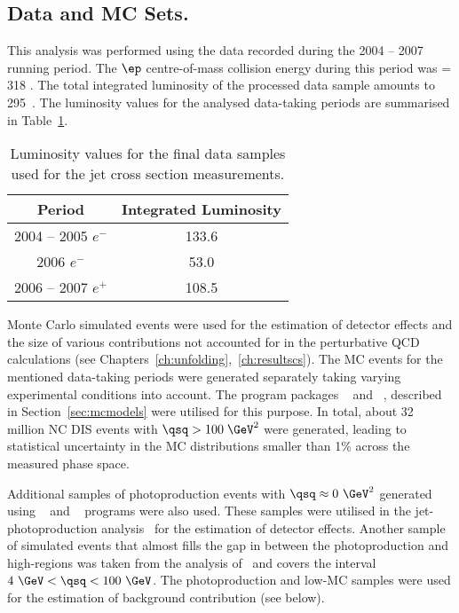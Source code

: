 \subsection{Data and MC Sets.}
This analysis was performed using the data recorded during the 2004 -- 2007 \hera running period. The $\ep$ centre-of-mass collision energy during this period was \sqs = 318 \GeV. The total integrated luminosity of the processed data sample amounts to 295~\invpb. The luminosity values for the analysed data-taking periods are summarised in Table~\ref{tab:selecteddatasample}.

\begin{table}[htpb!]
	\centering
		\begin{tabular}[h]{c|c}
		  \hline
			Period & Integrated Luminosity \\
			\hline \hline
			2004 -- 2005 $e^-$ & 133.6 \invpb  \T\B\\
			2006            $e^-$ & 53.0 \invpb   \T\B\\
			2006 -- 2007 $e^+$ & 108.5 \invpb \T\B\\
			\hline
		\end{tabular}
	\caption{Luminosity values for the final data samples used for the jet cross section measurements.}
	\label{tab:selecteddatasample}
\end{table}

Monte Carlo simulated events were used for the estimation of detector effects and the size of various contributions not accounted for in the perturbative QCD calculations (see Chapters~\ref{ch:unfolding},~\ref{ch:resultscs}). The MC events for the mentioned data-taking periods were generated separately taking varying experimental conditions into account. The program packages \lepto~\cite{Ingelman:1996mq} and \ariadne~\cite{cpc:71:15,Lonnblad:1994wk}, described in Section~\ref{sec:mcmodels} were utilised for this purpose. In total, about 32 million NC DIS events with $\qsq > 100\;\GeV^2$ were generated, leading to statistical uncertainty in the MC distributions smaller than 1\% across the measured phase space. 

Additional samples of photoproduction events with $\qsq\approx 0~\GeV^2$ generated using \herwig~\cite{cpc:67:465, jhep01:2001:010} and \pythia~\cite{cpc:82:74} programs were also used. These samples were utilised in the jet-photoproduction analysis~\cite{np:b864:1} for the estimation of detector effects. Another sample of simulated events that almost fills the gap in \qsq between the photoproduction and high-\qsq regions was taken from the analysis of~\cite{thesis:perrey:2011} and covers the interval $4~\GeV<\qsq<100~\GeV$. The photoproduction and low-\qsq MC samples were used for the estimation of background contribution (see below).

